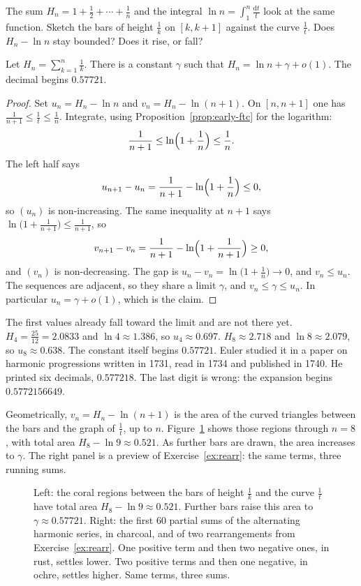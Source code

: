 \begin{think}
The sum $H_n=1+\frac12+\cdots+\frac1n$ and the integral $\ln n=\int_1^n\frac{\mathrm dt}t$ look at the same function. Sketch the bars of height $\frac1k$ on $[k,k+1]$ against the curve $\frac1t$. Does $H_n-\ln n$ stay bounded? Does it rise, or fall?
\end{think}

\begin{proposition}\label{prop:gamma}
Let $H_n=\sum_{k=1}^n\frac1k$. There is a constant $\gamma$ such that $H_n=\ln n+\gamma+o(1)$. The decimal begins $0.57721$.
\end{proposition}
\begin{proof}
Set $u_n=H_n-\ln n$ and $v_n=H_n-\ln(n+1)$. On $[n,n+1]$ one has $\frac1{n+1}\le\frac1t\le\frac1n$. Integrate, using Proposition~\ref{prop:early-ftc} for the logarithm:
\[
\frac1{n+1}\le\ln\Bigl(1+\frac1n\Bigr)\le\frac1n.
\]
The left half says
\[
u_{n+1}-u_n=\frac1{n+1}-\ln\Bigl(1+\frac1n\Bigr)\le0,
\]
so $(u_n)$ is non-increasing. The same inequality at $n+1$ says $\ln\bigl(1+\frac1{n+1}\bigr)\le\frac1{n+1}$, so
\[
v_{n+1}-v_n=\frac1{n+1}-\ln\Bigl(1+\frac1{n+1}\Bigr)\ge0,
\]
and $(v_n)$ is non-decreasing. The gap is $u_n-v_n=\ln\bigl(1+\frac1n\bigr)\to0$, and $v_n\le u_n$. The sequences are adjacent, so they share a limit $\gamma$, and $v_n\le\gamma\le u_n$. In particular $u_n=\gamma+o(1)$, which is the claim.
\end{proof}

The first values already fall toward the limit and are not there yet. $H_4=\frac{25}{12}=2.0833$ and $\ln4\approx1.386$, so $u_4\approx0.697$. $H_8\approx2.718$ and $\ln8\approx2.079$, so $u_8\approx0.638$. The constant itself begins $0.57721$. Euler studied it in a paper on harmonic progressions written in 1731, read in 1734 and published in 1740. He printed six decimals, $0.577218$. The last digit is wrong: the expansion begins $0.5772156649$.

Geometrically, $v_n=H_n-\ln(n+1)$ is the area of the curved triangles between the bars and the graph of $\frac1t$, up to $n$. Figure~\ref{fig:gamma} shows those regions through $n=8$, with total area $H_8-\ln9\approx0.521$. As further bars are drawn, the area increases to $\gamma$. The right panel is a preview of Exercise~\ref{ex:rearr}: the same terms, three running sums.

\begin{figure}[ht]
\centering
{}
\caption{Left: the coral regions between the bars of height $\frac1k$ and the curve $\frac1t$ have total area $H_8-\ln9\approx0.521$. Further bars raise this area to $\gamma\approx0.57721$. Right: the first $60$ partial sums of the alternating harmonic series, in charcoal, and of two rearrangements from Exercise~\ref{ex:rearr}. One positive term and then two negative ones, in rust, settles lower. Two positive terms and then one negative, in ochre, settles higher. Same terms, three sums.}
\label{fig:gamma}
\end{figure}

